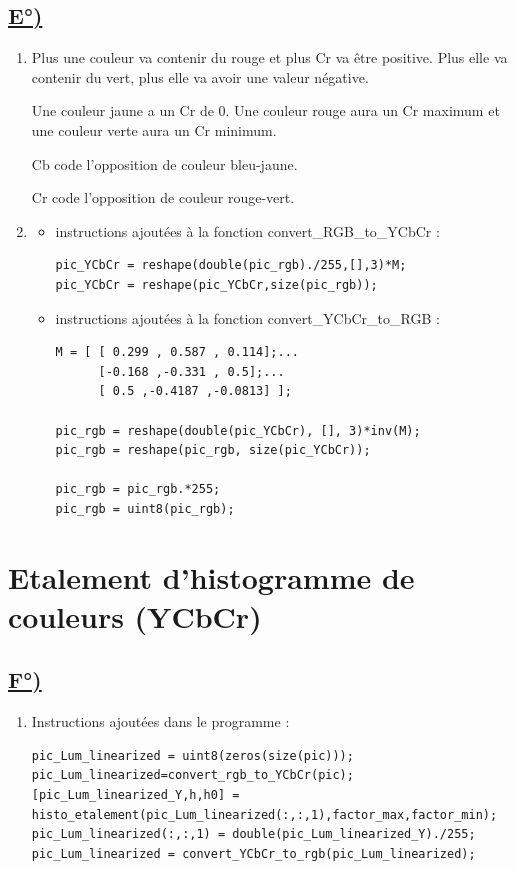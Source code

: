 \documentclass{article}
\begin{document}
\subsection*{\underline{E°)}}
\begin{enumerate}[label=\arabic*$\degres$)]
	\item Plus une couleur va contenir du rouge et plus Cr va être positive. Plus elle va contenir du vert, plus elle va avoir une valeur négative.

Une couleur jaune a un Cr de 0. Une couleur rouge aura un Cr maximum et une couleur verte aura un Cr minimum.

Cb code l'opposition de couleur bleu-jaune.

Cr code l'opposition de couleur rouge-vert.
	\item \begin{itemize}\renewcommand{\labelitemi}{$\bullet$}
		\item instructions ajoutées à la fonction convert\_RGB\_to\_YCbCr :

\begin{lstlisting}
pic_YCbCr = reshape(double(pic_rgb)./255,[],3)*M;
pic_YCbCr = reshape(pic_YCbCr,size(pic_rgb));
\end{lstlisting}

		\item instructions ajoutées à la fonction convert\_YCbCr\_to\_RGB :
\begin{lstlisting}
M = [ [ 0.299 , 0.587 , 0.114];...
      [-0.168 ,-0.331 , 0.5];...
      [ 0.5 ,-0.4187 ,-0.0813] ];
  
pic_rgb = reshape(double(pic_YCbCr), [], 3)*inv(M);
pic_rgb = reshape(pic_rgb, size(pic_YCbCr));

pic_rgb = pic_rgb.*255;
pic_rgb = uint8(pic_rgb);
\end{lstlisting}
	\end{itemize}
\end{enumerate}

\section*{Etalement d’histogramme de couleurs (YCbCr)}
\subsection*{\underline{F°)}}
\begin{enumerate}[label=\arabic*$\degres$)]
	\item Instructions ajoutées dans le programme :
\begin{lstlisting}
pic_Lum_linearized = uint8(zeros(size(pic)));
pic_Lum_linearized=convert_rgb_to_YCbCr(pic);
[pic_Lum_linearized_Y,h,h0] = histo_etalement(pic_Lum_linearized(:,:,1),factor_max,factor_min);
pic_Lum_linearized(:,:,1) = double(pic_Lum_linearized_Y)./255;
pic_Lum_linearized = convert_YCbCr_to_rgb(pic_Lum_linearized);
\end{lstlisting}
\end{enumerate}
\end{document}
